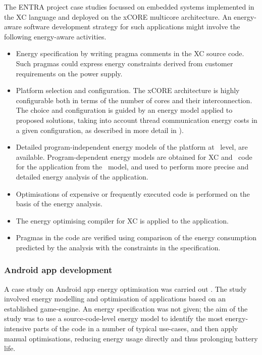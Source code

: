 \documentclass[oneside]{book}
\begin{document}
The ENTRA project case studies focussed on embedded systems implemented in the XC language and deployed on the xCORE multicore architecture.  An energy-aware software development strategy for such applications might involve the following energy-aware activities.
\begin{itemize}
\item
Energy specification by writing pragma comments in the XC source code.  Such pragmas could express energy constraints derived from customer requirements on the power supply.
\item
Platform selection and configuration.  The xCORE architecture is highly configurable both in terms of the number of cores and their interconnection.  The choice and configuration is guided by an energy model applied to proposed solutions, taking into account thread communication energy costs in a given configuration, as described in more detail in \cite{KerrisonSwallow15}).
\item
Detailed program-independent energy models of the platform at \isa\ level, are available.  
Program-dependent energy models are obtained for XC and \llvmir\ code for the application from the \isa\ model, and used to perform more precise and detailed energy analysis of the application.
\item
Optimisations of expensive or frequently executed code is performed on the basis of the energy analysis.
\item
The energy optimising compiler for XC is applied to the application.
\item
Pragmas in the code are verified using comparison of the energy consumption predicted by the analysis with the constraints in the specification.  

\end{itemize}


\subsubsection{Android app development}\label{android-scenario}

A case study on Android app energy optimisation was carried out \cite{LiGallagher-TSE-2016}.  The study involved  energy modelling and optimisation of applications based on an established game-engine.  An energy specification was not given; the aim of the study was to use a source-code-level energy model to identify the most energy-intensive parts of the code in a number of typical use-cases, and then apply manual optimisations, reducing energy usage directly and thus prolonging battery life.
\end{document}
